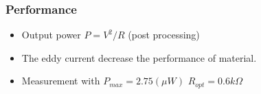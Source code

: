 \documentclass[compress]{beamer}
\begin{document}
\begin{frame}\frametitle{Performance}
\begin{itemize}[label=$\bullet$, font=\small, leftmargin=*]
\item Output power $P=V^2/R$ (post processing)
\item The eddy current decrease the performance of material.
\item Measurement with $P_{max}=2.75(\mu W)$ $R_{opt}=0.6 k\Omega$
\end{itemize}
\end{frame}
\end{document}
